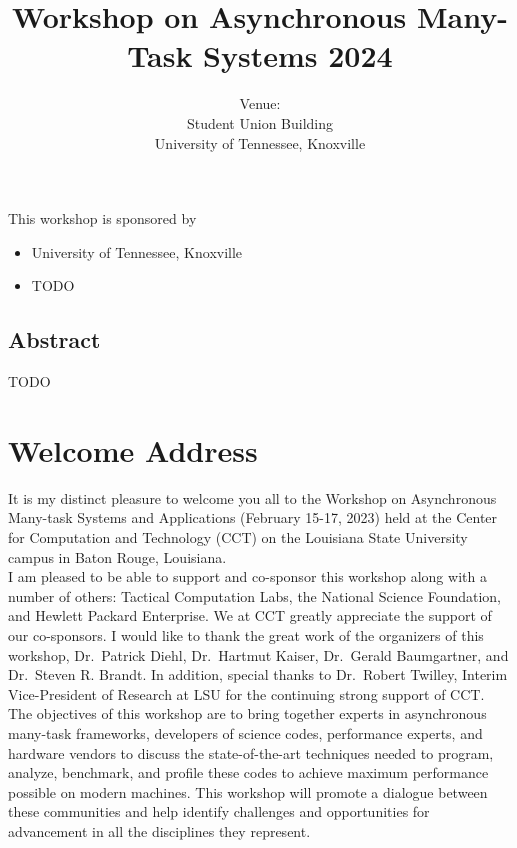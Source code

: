 \documentclass[12pt,letterpaper]{book}
\title{Workshop on Asynchronous Many-Task Systems 2024}
\author{Venue: \\ Student Union Building\\University of Tennessee, Knoxville}
\begin{document}
\frontmatter

\maketitle

This workshop is sponsored by

\begin{itemize}
\item University of Tennessee, Knoxville
\item TODO
\end{itemize}

\newpage

\section*{Abstract}


TODO

\chapter{Welcome Address}
It is my distinct pleasure to welcome you all to the Workshop on Asynchronous Many-task Systems and Applications (February 15-17, 2023) held at the Center for Computation and Technology (CCT) on the Louisiana State University campus in Baton Rouge, Louisiana.\\

\noindent I am pleased to be able to support and co-sponsor this workshop along with a number of others: Tactical Computation Labs, the National Science Foundation, and Hewlett Packard Enterprise. We at CCT greatly appreciate the support of our co-sponsors. I would like to thank the great work of the organizers of this workshop, Dr.\ Patrick Diehl, Dr.\ Hartmut Kaiser, Dr.\ Gerald Baumgartner, and Dr.\ Steven R. Brandt. In addition, special thanks to Dr.\ Robert Twilley, Interim Vice-President of Research at LSU for the continuing strong support of CCT.\\

\noindent The objectives of this workshop are to bring together experts in asynchronous many-task frameworks, developers of science codes, performance experts, and hardware vendors to discuss the state-of-the-art techniques needed to program, analyze, benchmark, and profile these codes to achieve maximum performance possible on modern machines. This workshop will promote a dialogue between these communities and help identify challenges and opportunities for advancement in all the disciplines they represent.\\
\end{document}
